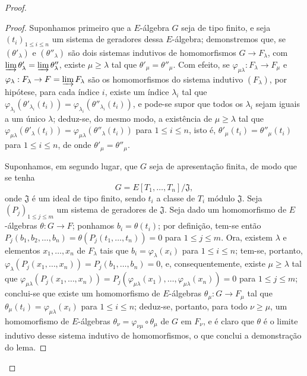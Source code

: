 \begin{proof}
\begin{proof}
Suponhamos primeiro que a $E$-álgebra $G$ seja de tipo finito, e seja $(t_i)_{1\leqslant i\leqslant n}$ um sistema de geradores dessa $E$-álgebra; demonstremos que, se $(\theta'_\lambda)$ e $(\theta''_\lambda)$ são dois sistemas indutivos de homomorfismos $G\to F_\lambda$, com $\varinjlim\theta'_\lambda=\varinjlim\theta''_\lambda$, existe $\mu\geqslant\lambda$ tal que $\theta'_\mu=\theta''_\mu$.
Com efeito, se $\varphi_{\mu\lambda}:F_\lambda\to F_\mu$ e $\varphi_\lambda:F_\lambda\to F=\varinjlim F_\lambda$ são os homomorfismos do sistema indutivo $(F_\lambda)$, por hipótese, para cada índice $i$, existe um índice $\lambda_i$ tal que $\varphi_{\lambda_i}(\theta'_{\lambda_i}(t_i))=\varphi_{\lambda_i}(\theta''_{\lambda_i}(t_i))$, e pode-se supor que todos os $\lambda_i$ sejam iguais a um único $\lambda$; deduz-se, do mesmo modo, a existência de $\mu\geqslant\lambda$ tal que $\varphi_{\mu\lambda}(\theta'_\lambda(t_i))=\varphi_{\mu\lambda}(\theta''_\lambda(t_i))$ para $1\leqslant i\leqslant n$, isto é, $\theta'_\mu(t_i)=\theta''_\mu(t_i)$ para $1\leqslant i\leqslant n$, de onde $\theta'_\mu=\theta''_\mu$.

Suponhamos, em segundo lugar, que $G$ seja de apresentação finita, de modo que se tenha
\[
  G=E[T_1,\ldots,T_n]/\mathfrak{J},
\]
onde $\mathfrak{J}$ é um ideal de tipo finito, sendo $t_i$ a classe de $T_i$ módulo $\mathfrak{J}$.
Seja $(P_j)_{1\leqslant j\leqslant m}$ um sistema de geradores de $\mathfrak{J}$.
Seja dado um homomorfismo de $E$-álgebras $\theta:G\to F$; ponhamos $b_i=\theta(t_i)$; por definição, tem-se então $P_j(b_1,b_2,\ldots,b_n)=\theta(P_j(t_1,\ldots,t_n))=0$ para $1\leqslant j\leqslant m$.
Ora, existem $\lambda$ e elementos $x_1,\ldots,x_n$ de $F_\lambda$ tais que $b_i=\varphi_\lambda(x_i)$ para $1\leqslant i\leqslant n$; tem-se, portanto, $\varphi_\lambda(P_j(x_1,\ldots,x_n))=P_j(b_1,\ldots,b_n)=0$, e, consequentemente, existe $\mu\geqslant\lambda$ tal que $\varphi_{\mu\lambda}(P_j(x_1,\ldots,x_n))=P_j(\varphi_{\mu\lambda}(x_1),\ldots,\varphi_{\mu\lambda}(x_n))=0$ para $1\leqslant j\leqslant m$; conclui-se que existe um homomorfismo de $E$-álgebras $\theta_\mu:G\to F_\mu$ tal que $\theta_\mu(t_i)=\varphi_{\mu\lambda}(x_i)$
para $1\leqslant i\leqslant n$; deduz-se, portanto, para todo $\nu\geqslant\mu$, um homomorfismo de $E$-álgebras $\theta_\nu=\varphi_{\nu\mu}\circ\theta_\mu$ de $G$ em $F_\nu$, e é claro que $\theta$ é o limite indutivo desse sistema indutivo de homomorfismos, o que conclui a demonstração do lema.
\end{proof}


\end{proof}

